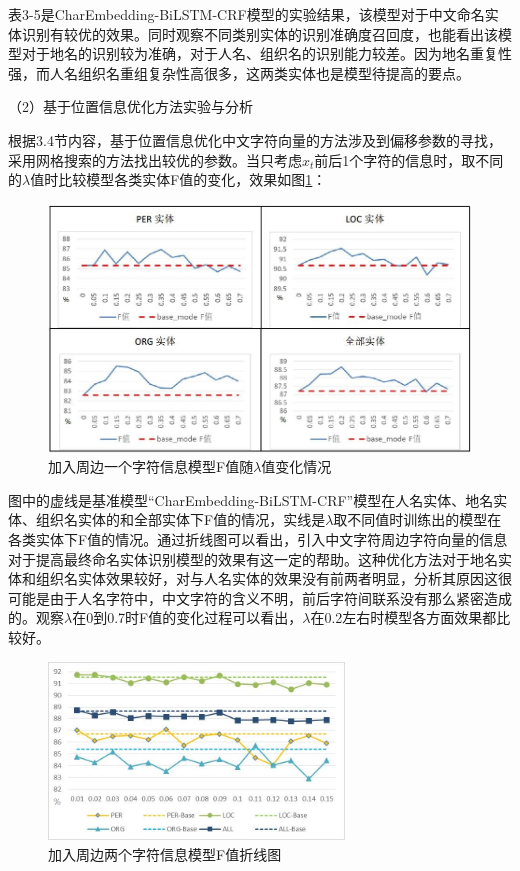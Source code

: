 \documentclass[winfonts,master,oneside,nobackinfo]{njuthesis}
\begin{document}
表3-5是CharEmbedding-BiLSTM-CRF模型的实验结果，该模型对于中文命名实体识别有较优的效果。同时观察不同类别实体的识别准确度召回度，也能看出该模型对于地名的识别较为准确，对于人名、组织名的识别能力较差。因为地名重复性强，而人名组织名重组复杂性高很多，这两类实体也是模型待提高的要点。

（2）基于位置信息优化方法实验与分析

根据3.4节内容，基于位置信息优化中文字符向量的方法涉及到偏移参数的寻找，采用网格搜索的方法找出较优的参数。当只考虑$x_{t}$前后1个字符的信息时，取不同的$\lambda$值时比较模型各类实体F值的变化，效果如图\ref{k=1}：

\begin{figure}[h]
\centering
\includegraphics[width=1\textwidth]{./figure/参数1.jpg}
\caption{加入周边一个字符信息模型F值随$\lambda$值变化情况}
\label{k=1}
\end{figure}

图中的虚线是基准模型“CharEmbedding-BiLSTM-CRF”模型在人名实体、地名实体、组织名实体的和全部实体下F值的情况，实线是$\lambda$取不同值时训练出的模型在各类实体下F值的情况。通过折线图可以看出，引入中文字符周边字符向量的信息对于提高最终命名实体识别模型的效果有这一定的帮助。这种优化方法对于地名实体和组织名实体效果较好，对与人名实体的效果没有前两者明显，分析其原因这很可能是由于人名字符中，中文字符的含义不明，前后字符间联系没有那么紧密造成的。观察$\lambda$在0到0.7时F值的变化过程可以看出，$\lambda$在0.2左右时模型各方面效果都比较好。


\begin{figure}[h]
\centering
\includegraphics[width=0.7\textwidth]{./figure/参数2.jpg}
\caption{加入周边两个字符信息模型F值折线图}
\label{k=2}
\end{figure}
\end{document}
